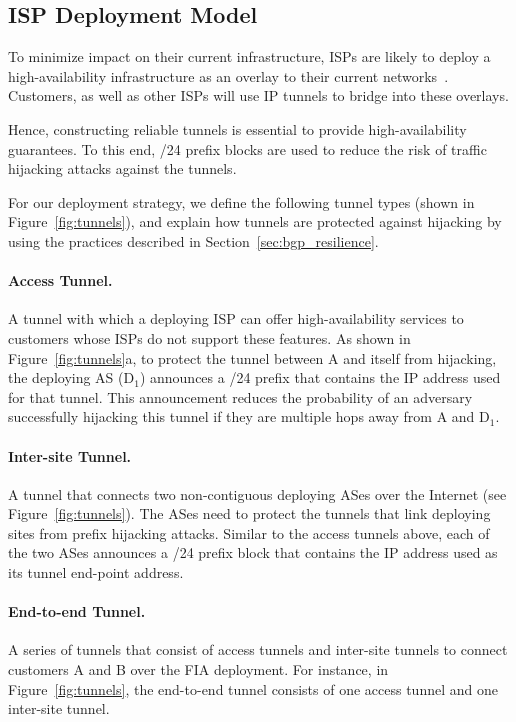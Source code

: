 \subsection{ISP Deployment Model}
\label{ssec:deployment_model}

To minimize impact on their current infrastructure, ISPs are likely to deploy a
high-availability infrastructure as an overlay to their current
networks~\cite{peterson2003blueprint}. Customers, as well as other ISPs will
use IP tunnels to bridge into these overlays. 

Hence, constructing reliable tunnels is essential to provide high-availability
guarantees. To this end, /24 prefix blocks are used to reduce the risk of
traffic hijacking attacks against the tunnels. 

For our deployment strategy, we define the following tunnel types (shown in
Figure~\ref{fig:tunnels}), and explain how tunnels are protected against
hijacking by using the practices described in Section~\ref{sec:bgp_resilience}.

\paragraph{Access Tunnel.} A tunnel with which a deploying ISP can offer
high-availability services to customers whose ISPs do not support these
features. As shown in Figure~\ref{fig:tunnels}a, to protect the tunnel between
A and itself from hijacking, the deploying AS (D$_1$) announces a /24 prefix
that  contains the IP address used for that tunnel. This announcement reduces
the probability of an adversary successfully hijacking this tunnel if they are
multiple hops away from A and D$_1$.

\paragraph{Inter-site Tunnel.} A tunnel that connects two non-contiguous
deploying ASes over the Internet (see Figure~\ref{fig:tunnels}). The ASes need
to protect the tunnels that link deploying sites from prefix hijacking attacks.
Similar to the access tunnels above, each of the two ASes announces a /24
prefix block that contains the IP address used as its tunnel end-point address. 

\paragraph{End-to-end Tunnel.} A series of tunnels that consist of access
tunnels and inter-site tunnels to connect customers A and B over the FIA
deployment. For instance, in Figure~\ref{fig:tunnels}, the end-to-end tunnel
consists of one access tunnel and one inter-site tunnel.

